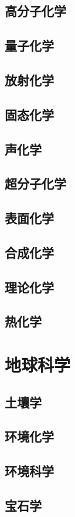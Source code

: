 \section{高分子化学}
\section{量子化学}
\section{放射化学}
\section{固态化学}
\section{声化学}
\section{超分子化学}
\section{表面化学}
\section{合成化学}
\section{理论化学}
\section{热化学}



\chapter{地球科学}
\section{土壤学}
\section{环境化学}
\section{环境科学}
\section{宝石学}
